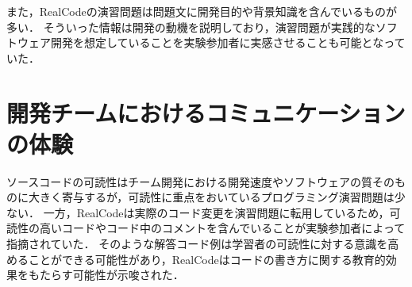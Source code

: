 また，RealCodeの演習問題は問題文に開発目的や背景知識を含んでいるものが多い．
そういった情報は開発の動機を説明しており，演習問題が実践的なソフトウェア開発を想定していることを実験参加者に実感させることも可能となっていた．





\section*{開発チームにおけるコミュニケーションの体験}


ソースコードの可読性はチーム開発における開発速度やソフトウェアの質そのものに大きく寄与するが，可読性に重点をおいているプログラミング演習問題は少ない．
一方，RealCodeは実際のコード変更を演習問題に転用しているため，可読性の高いコードやコード中のコメントを含んでいることが実験参加者によって指摘されていた．
そのような解答コード例は学習者の可読性に対する意識を高めることができる可能性があり，RealCodeはコードの書き方に関する教育的効果をもたらす可能性が示唆された．




